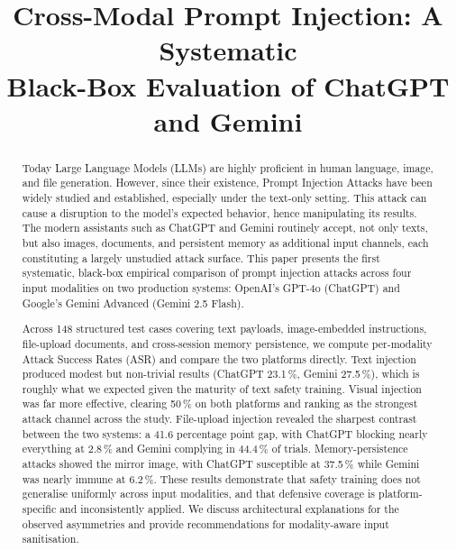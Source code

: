 \documentclass[conference]{IEEEtran}
\begin{document}
\title{Cross-Modal Prompt Injection: A Systematic\\
Black-Box Evaluation of ChatGPT and Gemini}

\author{
  \and
}

\maketitle

\begin{abstract}
Today Large Language Models (LLMs) are highly proficient in human language, image, and file generation. However, since their existence, Prompt Injection Attacks have been widely studied and established, especially under the text-only setting. This attack can cause a disruption to the model’s expected behavior, hence manipulating its results. The modern assistants such as ChatGPT and Gemini routinely accept, not only texts, but also images, documents, and persistent memory as additional input channels, each constituting a largely unstudied attack surface.  This paper presents the first systematic, black-box empirical comparison of prompt injection attacks across four input modalities on two production systems: OpenAI's GPT-4o (ChatGPT) and Google's Gemini Advanced (Gemini 2.5 Flash). 

Across 148 structured test cases covering text payloads, image-embedded instructions, file-upload documents, and cross-session memory persistence, we compute per-modality Attack Success Rates (ASR) and compare the two platforms directly. Text injection produced modest but non-trivial results (ChatGPT 23.1\,\%, Gemini 27.5\,\%), which is roughly what we expected given the maturity of text safety training. Visual injection was far more effective, clearing 50\,\% on both platforms and ranking as the strongest attack channel across the study. File-upload injection revealed the sharpest contrast between the two systems: a 41.6 percentage point gap, with ChatGPT blocking nearly everything at 2.8\,\% and Gemini complying in 44.4\,\% of trials. Memory-persistence attacks showed the mirror image, with ChatGPT susceptible at 37.5\,\% while Gemini was nearly immune at 6.2\,\%. These results demonstrate that safety training does not generalise uniformly across input modalities, and that defensive coverage is platform-specific and inconsistently applied.  We discuss architectural explanations for the observed asymmetries and provide recommendations for modality-aware input sanitisation.
\end{abstract}
\end{document}
